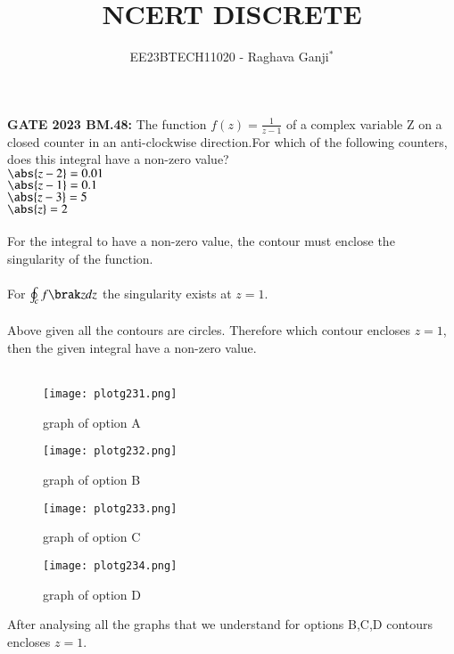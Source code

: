 \documentclass[journal,12pt,twocolumn]{IEEEtran}
\theoremstyle{remark}
\begin{document}

\vspace{3cm}

\title{NCERT DISCRETE}
\author{EE23BTECH11020 - Raghava Ganji$^{*}$%
}
\maketitle
\newpage
\bigskip

\renewcommand{\thefigure}{\theenumi}
\renewcommand{\thetable}{\theenumi}

\textbf{GATE 2023 BM.48:}
The function $f(z)=\frac{1}{z-1}$ of a complex variable Z on a closed counter in an anti-clockwise direction.For which of the following counters, does this integral have a non-zero value?\\
$\abs{z-2}=0.01$\\
$\abs{z-1}=0.1$\\
$\abs{z-3}=5$\\
$\abs{z}=2$\\
\solution\\
For the integral to have a non-zero value, the contour must enclose the singularity of the function.\\\\
For $\oint_{c}f\brak zdz$ the singularity exists at $z=1$.\\\\
Above given all the contours are circles. Therefore which contour encloses $z=1$, then the given integral have a non-zero value.\\\\
\begin{figure}
    \centering
    \texttt{[image: plotg231.png]}
    \caption{graph of option A}
\end{figure}
\begin{figure}
    \centering
    \texttt{[image: plotg232.png]}
    \caption{graph of option B}
\end{figure}
\begin{figure}
    \centering
    \texttt{[image: plotg233.png]}
    \caption{graph of option C}
\end{figure}
\begin{figure}
    \centering
    \texttt{[image: plotg234.png]}
    \caption{graph of option D}
\end{figure}
After analysing all the graphs that we understand for options B,C,D contours encloses $z=1$. 
\end{document}

